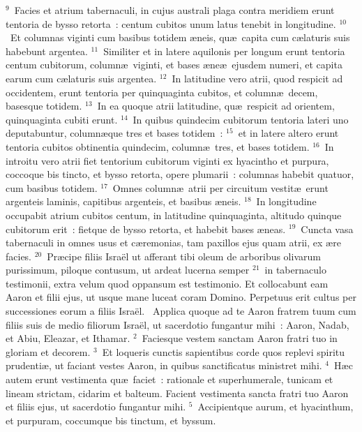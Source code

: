 ${}^{9}$~Facies et atrium tabernaculi, in cujus australi plaga contra meridiem erunt tentoria de bysso retorta~: centum cubitos unum latus tenebit in longitudine.
${}^{10}$~Et columnas viginti cum basibus totidem \ae neis, qu\ae\ capita cum c\ae laturis suis habebunt argentea.
${}^{11}$~Similiter et in latere aquilonis per longum erunt tentoria centum cubitorum, column\ae\ viginti, et bases \ae ne\ae\ ejusdem numeri, et capita earum cum c\ae laturis suis argentea.
${}^{12}$~In latitudine vero atrii, quod respicit ad occidentem, erunt tentoria per quinquaginta cubitos, et column\ae\ decem, basesque totidem.
${}^{13}$~In ea quoque atrii latitudine, qu\ae\ respicit ad orientem, quinquaginta cubiti erunt.
${}^{14}$~In quibus quindecim cubitorum tentoria lateri uno deputabuntur, column\ae que tres et bases totidem~:
${}^{15}$~et in latere altero erunt tentoria cubitos obtinentia quindecim, column\ae\ tres, et bases totidem.
${}^{16}$~In introitu vero atrii fiet tentorium cubitorum viginti ex hyacintho et purpura, coccoque bis tincto, et bysso retorta, opere plumarii~: columnas habebit quatuor, cum basibus totidem.
${}^{17}$~Omnes column\ae\ atrii per circuitum vestit\ae\ erunt argenteis laminis, capitibus argenteis, et basibus \ae neis.
${}^{18}$~In longitudine occupabit atrium cubitos centum, in latitudine quinquaginta, altitudo quinque cubitorum erit~: fietque de bysso retorta, et habebit bases \ae neas.
${}^{19}$~Cuncta vasa tabernaculi in omnes usus et c\ae remonias, tam paxillos ejus quam atrii, ex \ae re facies.
${}^{20}$~Pr\ae cipe filiis Isra\"el ut afferant tibi oleum de arboribus olivarum purissimum, piloque contusum, ut ardeat lucerna semper
${}^{21}$~in tabernaculo testimonii, extra velum quod oppansum est testimonio. Et collocabunt eam Aaron et filii ejus, ut usque mane luceat coram Domino. Perpetuus erit cultus per successiones eorum a filiis Isra\"el.
~Applica quoque ad te Aaron fratrem tuum cum filiis suis de medio filiorum Isra\"el, ut sacerdotio fungantur mihi~: Aaron, Nadab, et Abiu, Eleazar, et Ithamar.
${}^{2}$~Faciesque vestem sanctam Aaron fratri tuo in gloriam et decorem.
${}^{3}$~Et loqueris cunctis sapientibus corde quos replevi spiritu prudenti\ae , ut faciant vestes Aaron, in quibus sanctificatus ministret mihi.
${}^{4}$~H\ae c autem erunt vestimenta qu\ae\ faciet~: rationale et superhumerale, tunicam et lineam strictam, cidarim et balteum. Facient vestimenta sancta fratri tuo Aaron et filiis ejus, ut sacerdotio fungantur mihi.
${}^{5}$~Accipientque aurum, et hyacinthum, et purpuram, coccumque bis tinctum, et byssum.


